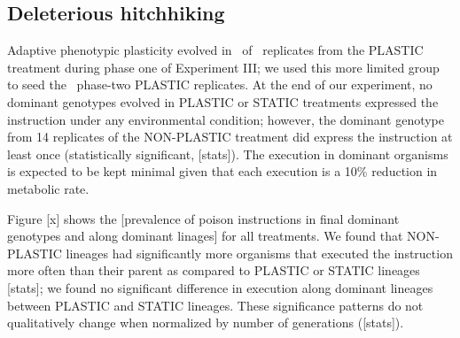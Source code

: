 \subsection{Deleterious hitchhiking}



Adaptive phenotypic plasticity evolved in \deleteriousHitchhikingPlasticReps\ of \deleteriousHitchhikingReplicates\ replicates from the PLASTIC treatment during phase one of Experiment III; we used this more limited group to seed the \deleteriousHitchhikingPlasticReps\ phase-two PLASTIC replicates.
At the end of our experiment, no dominant genotypes evolved in PLASTIC or STATIC treatments expressed the  instruction under any environmental condition; however, the dominant genotype from 14 replicates of the NON-PLASTIC treatment did express the  instruction at least once (statistically significant, [stats]).
The  execution in dominant organisms is expected to be kept minimal given that each execution is a 10\% reduction in metabolic rate.


Figure [x] shows the [prevalence of poison instructions in final dominant genotypes and along dominant linages] for all treatments.
We found that NON-PLASTIC lineages had significantly more organisms that executed the  instruction more often than their parent as compared to PLASTIC or STATIC lineages [stats]; we found no significant difference in  execution along dominant lineages between PLASTIC and STATIC lineages.
These significance patterns do not qualitatively change when normalized by number of generations ([stats]).

